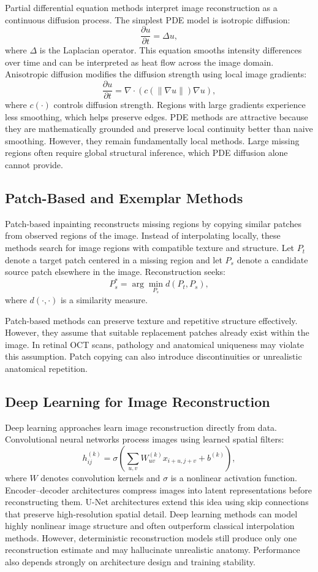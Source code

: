 \documentclass[12pt,oneside]{article}
\begin{document}
Partial differential equation methods interpret image reconstruction as a continuous diffusion process. The simplest PDE model is isotropic diffusion:
\[
\frac{\partial u}{\partial t}
=
\Delta u,
\]
where $\Delta$ is the Laplacian operator. This equation smooths intensity differences over time and can be interpreted as heat flow across the image domain.
Anisotropic diffusion modifies the diffusion strength using local image gradients:
\[
\frac{\partial u}{\partial t}
=
\nabla \cdot
\left(
c(\|\nabla u\|)\nabla u
\right),
\]
where $c(\cdot)$ controls diffusion strength. Regions with large gradients experience less smoothing, which helps preserve edges.
PDE methods are attractive because they are mathematically grounded and preserve local continuity better than naive smoothing. However, they remain fundamentally local methods. Large missing regions often require global structural inference, which PDE diffusion alone cannot provide.

\subsection*{Patch-Based and Exemplar Methods}

Patch-based inpainting reconstructs missing regions by copying similar patches from observed regions of the image. Instead of interpolating locally, these methods search for image regions with compatible texture and structure.
Let $P_t$ denote a target patch centered in a missing region and let $P_s$ denote a candidate source patch elsewhere in the image. Reconstruction seeks:
\[
P_s^\ast
=
\arg\min_{P_s}
d(P_t,P_s),
\]
where $d(\cdot,\cdot)$ is a similarity measure.

Patch-based methods can preserve texture and repetitive structure effectively. However, they assume that suitable replacement patches already exist within the image. In retinal OCT scans, pathology and anatomical uniqueness may violate this assumption. Patch copying can also introduce discontinuities or unrealistic anatomical repetition.

\subsection*{Deep Learning for Image Reconstruction}

Deep learning approaches learn image reconstruction directly from data. Convolutional neural networks process images using learned spatial filters:
\[
h_{ij}^{(k)}
=
\sigma
\left(
\sum_{u,v}
W_{uv}^{(k)}
x_{i+u,j+v}
+b^{(k)}
\right),
\]
where $W$ denotes convolution kernels and $\sigma$ is a nonlinear activation function.
Encoder--decoder architectures compress images into latent representations before reconstructing them. U-Net architectures extend this idea using skip connections that preserve high-resolution spatial detail.
Deep learning methods can model highly nonlinear image structure and often outperform classical interpolation methods. However, deterministic reconstruction models still produce only one reconstruction estimate and may hallucinate unrealistic anatomy. Performance also depends strongly on architecture design and training stability.
\end{document}
